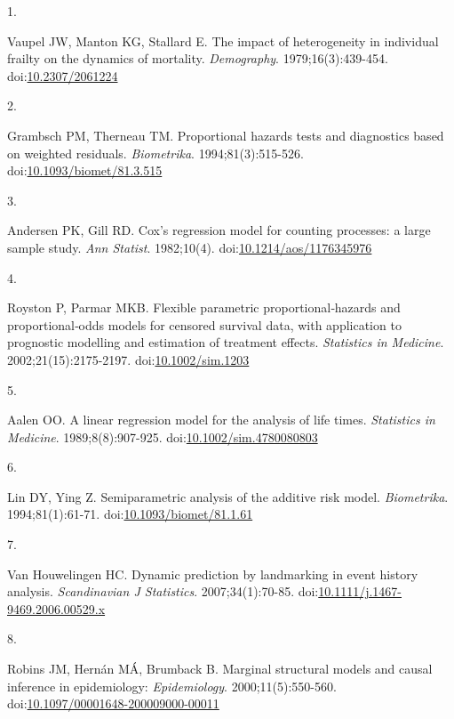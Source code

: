 \documentclass[
]{article}
\newlength{\cslhangindent}
\newlength{\csllabelwidth}
\newenvironment{CSLReferences}[2] %
 {\begin{list}{}{%
  \setlength{\itemindent}{0pt}
  \setlength{\leftmargin}{0pt}
  \setlength{\parsep}{0pt}
  \ifodd #1
   \setlength{\leftmargin}{\cslhangindent}
   \setlength{\itemindent}{-1\cslhangindent}
  \fi
  \setlength{\itemsep}{#2\baselineskip}}}
 {\end{list}}
\newcommand{\CSLLeftMargin}[1]{\parbox[t]{\csllabelwidth}{\strut#1\strut}}
\newcommand{\CSLRightInline}[1]{\parbox[t]{\linewidth - \csllabelwidth}{\strut#1\strut}}
\begin{document}
\protect{}\label{refs}
\begin{CSLReferences}{0}{1}
\CSLLeftMargin{1. }%
\CSLRightInline{Vaupel JW, Manton KG, Stallard E. The impact of
heterogeneity in individual frailty on the dynamics of mortality.
\emph{Demography}. 1979;16(3):439-454.
doi:\href{https://doi.org/10.2307/2061224}{10.2307/2061224}}

\CSLLeftMargin{2. }%
\CSLRightInline{Grambsch PM, Therneau TM. Proportional hazards tests and
diagnostics based on weighted residuals. \emph{Biometrika}.
1994;81(3):515-526.
doi:\href{https://doi.org/10.1093/biomet/81.3.515}{10.1093/biomet/81.3.515}}

\CSLLeftMargin{3. }%
\CSLRightInline{Andersen PK, Gill RD. Cox's regression model for
counting processes: a large sample study. \emph{Ann Statist}.
1982;10(4).
doi:\href{https://doi.org/10.1214/aos/1176345976}{10.1214/aos/1176345976}}

\CSLLeftMargin{4. }%
\CSLRightInline{Royston P, Parmar MKB. Flexible parametric
proportional‐hazards and proportional‐odds models for censored survival
data, with application to prognostic modelling and estimation of
treatment effects. \emph{Statistics in Medicine}. 2002;21(15):2175-2197.
doi:\href{https://doi.org/10.1002/sim.1203}{10.1002/sim.1203}}

\CSLLeftMargin{5. }%
\CSLRightInline{Aalen OO. A linear regression model for the analysis of
life times. \emph{Statistics in Medicine}. 1989;8(8):907-925.
doi:\href{https://doi.org/10.1002/sim.4780080803}{10.1002/sim.4780080803}}

\CSLLeftMargin{6. }%
\CSLRightInline{Lin DY, Ying Z. Semiparametric analysis of the additive
risk model. \emph{Biometrika}. 1994;81(1):61-71.
doi:\href{https://doi.org/10.1093/biomet/81.1.61}{10.1093/biomet/81.1.61}}

\CSLLeftMargin{7. }%
\CSLRightInline{Van Houwelingen HC. Dynamic prediction by landmarking in
event history analysis. \emph{Scandinavian J Statistics}.
2007;34(1):70-85.
doi:\href{https://doi.org/10.1111/j.1467-9469.2006.00529.x}{10.1111/j.1467-9469.2006.00529.x}}

\CSLLeftMargin{8. }%
\CSLRightInline{Robins JM, Hernán MÁ, Brumback B. Marginal structural
models and causal inference in epidemiology: \emph{Epidemiology}.
2000;11(5):550-560.
doi:\href{https://doi.org/10.1097/00001648-200009000-00011}{10.1097/00001648-200009000-00011}}


\end{CSLReferences}
\end{document}
